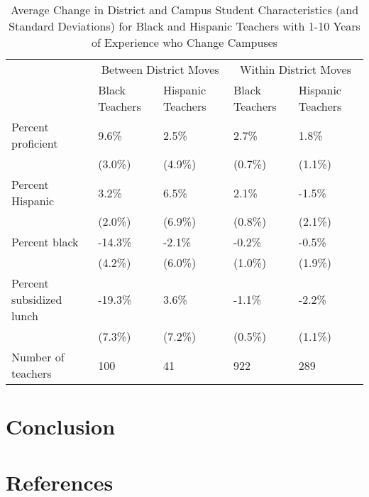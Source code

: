 \documentclass[]{article}
\begin{document}
\begin{table}[ht]
\centering
\begin{tabular}{lp{}p{}p{}p{}}
  \hline
 & \multicolumn{2}{c}{Between District Moves} & \multicolumn{2}{c}{Within District Moves}\\ \cline{2-5}
 & Black Teachers & Hispanic Teachers & Black Teachers & Hispanic Teachers \\
  \hline
Percent proficient & 9.6\% & 2.5\% & 2.7\% & 1.8\% \\ 
   & (3.0\%) & (4.9\%) & (0.7\%) & (1.1\%) \\ 
  Percent Hispanic & 3.2\% & 6.5\% & 2.1\% & -1.5\% \\ 
   & (2.0\%) & (6.9\%) & (0.8\%) & (2.1\%) \\ 
  Percent black & -14.3\% & -2.1\% & -0.2\% & -0.5\% \\ 
   & (4.2\%) & (6.0\%) & (1.0\%) & (1.9\%) \\ 
  Percent subsidized lunch & -19.3\% & 3.6\% & -1.1\% & -2.2\% \\ 
   & (7.3\%) & (7.2\%) & (0.5\%) & (1.1\%) \\ 
  Number of teachers & 100 & 41 & 922 & 289 \\ 
   \hline
\end{tabular}
\caption{Average Change in District and Campus Student Characteristics (and Standard Deviations) for Black and Hispanic Teachers with 1-10 Years of Experience who Change Campuses} 
\label{tbl:change_by_eth}
\end{table}

\section{Conclusion}\label{conclusion}

\section{References}\label{references}
\end{document}
